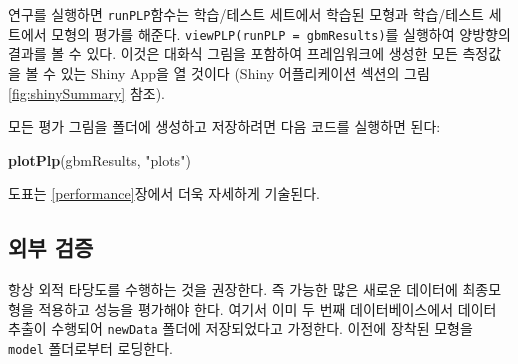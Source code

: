 \documentclass[11pt]{book}
\newenvironment{Shaded}{\begin{snugshade}}{\end{snugshade}}
\newcommand{\KeywordTok}[1]{\textcolor[rgb]{0.13,0.29,0.53}{\textbf{#1}}}
\newcommand{\StringTok}[1]{\textcolor[rgb]{0.31,0.60,0.02}{#1}}
\newcommand{\NormalTok}[1]{#1}
\theoremstyle{definition}
\theoremstyle{definition}
\theoremstyle{definition}
\theoremstyle{remark}
\begin{document}
연구를 실행하면 \texttt{runPLP}함수는 학습/테스트 세트에서 학습된 모형과
학습/테스트 세트에서 모형의 평가를 해준다.
\texttt{viewPLP(runPLP\ =\ gbmResults)}를 실행하여 양방향의 결과를 볼 수
있다. 이것은 대화식 그림을 포함하여 프레임워크에 생성한 모든 측정값을 볼
수 있는 Shiny App을 열 것이다 (Shiny 어플리케이션 섹션의 그림
\ref{fig:shinySummary} 참조).

모든 평가 그림을 폴더에 생성하고 저장하려면 다음 코드를 실행하면 된다:

\begin{Shaded}
\begin{Highlighting}[]
\KeywordTok{plotPlp}\NormalTok{(gbmResults, }\StringTok{"plots"}\NormalTok{)}
\end{Highlighting}
\end{Shaded}

도표는 \ref{performance}장에서 더욱 자세하게 기술된다.

\subsection{외부 검증}\label{-}

항상 외적 타당도를 수행하는 것을 권장한다. 즉 가능한 많은 새로운
데이터에 최종모형을 적용하고 성능을 평가해야 한다. 여기서 이미 두 번째
데이터베이스에서 데이터 추출이 수행되어 \texttt{newData} 폴더에
저장되었다고 가정한다. 이전에 장착된 모형을 \texttt{model} 폴더로부터
로딩한다.
\end{document}

